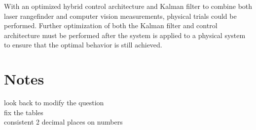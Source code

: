 \documentclass[journal, 10pt]{IEEEtran}
\begin{document}
With an optimized hybrid control architecture and Kalman filter to combine both laser rangefinder and computer vision measurements, physical trials could be performed.  Further optimization of both the Kalman filter and control architecture must be performed after the system is applied to a physical system to ensure that the optimal behavior is still achieved.

\section{Notes}
look back to modify the question \\
fix the tables \\
consistent 2 decimal places on numbers 
\nocite{*}

{}
\end{document}
